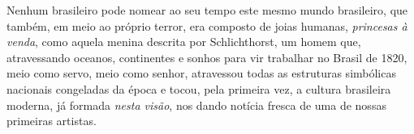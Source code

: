 Nenhum brasileiro pode nomear ao seu tempo este mesmo mundo brasileiro,
que também, em meio ao próprio terror, era composto de joias humanas,
\emph{princesas à venda}, como aquela menina descrita por Schlichthorst,
um homem que, atravessando oceanos, continentes e sonhos para vir
trabalhar no Brasil de 1820, meio como servo, meio como senhor,
atravessou todas as estruturas simbólicas nacionais congeladas da época
e tocou, pela primeira vez, a cultura brasileira moderna, já formada
\emph{nesta visão}, nos dando notícia fresca de uma de nossas primeiras
artistas.